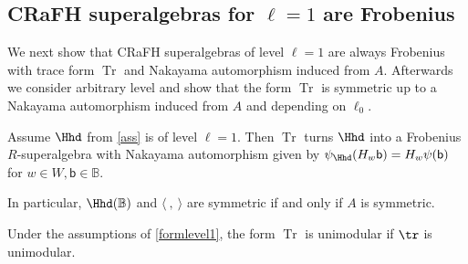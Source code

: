 \documentclass[a4paper,11pt]{amsart}
\let\<\langle
\let\>\rangle
\newcommand{\Tr}{\op{Tr}}
\numberwithin{equation}{subsection}
\theoremstyle{definition}
\theoremstyle{theorem}
\theoremstyle{remark}
\newcommand\Sym{W}
\newcommand\bb{\mathsf{b}}
\newcommand\op{\operatorname}
\newcommand{\Bo}{\mathbb{B}}
\begin{document}
\subsection{CRaFH superalgebras for $\ell=1$ are Frobenius}
We next show that CRaFH superalgebras of level $\ell=1$ are always Frobenius with trace form $\Tr$ and Nakayama automorphism induced from $A$. Afterwards we consider arbitrary level and show that the form $\Tr$ is symmetric up to a Nakayama automorphism induced from $A$ and depending on $\ell_0$.
\begin{Theorem}\label{formlevel1}
Assume  $\Hhd$ from \autoref{ass} is of level $\ell=1$. Then $\Tr$ turns $\Hhd$ into a Frobenius $R$-superalgebra with Nakayama automorphism given by $\psi_{\Hhd}(H_w\bb)=H_w\psi(\bb)$ for  $w\in\Sym, \bb\in\Bo$.

In particular, $\Hhd(\Bo)$ and $\<\ ,\ \>$ are symmetric if and only if  $A$ is symmetric.
\end{Theorem}
\begin{Remark}
Under the assumptions of \autoref{formlevel1}, the form $\Tr$ is unimodular if $\tr$ is unimodular.
\end{Remark}
\end{document}
